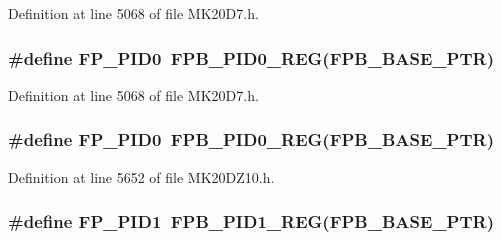 Definition at line 5068 of file M\+K20\+D7.\+h.

\subsubsection[{\texorpdfstring{F\+P\+\_\+\+P\+I\+D0}{FP_PID0}}]{\setlength{\rightskip}{0pt plus 5cm}\#define F\+P\+\_\+\+P\+I\+D0~{\bf F\+P\+B\+\_\+\+P\+I\+D0\+\_\+\+R\+EG}({\bf F\+P\+B\+\_\+\+B\+A\+S\+E\+\_\+\+P\+TR})}\hypertarget{group___f_p_b___register___accessor___macros_ga8e0747f228e5fad0edcf470d86723339}{}\label{group___f_p_b___register___accessor___macros_ga8e0747f228e5fad0edcf470d86723339}


Definition at line 5068 of file M\+K20\+D7.\+h.

\subsubsection[{\texorpdfstring{F\+P\+\_\+\+P\+I\+D0}{FP_PID0}}]{\setlength{\rightskip}{0pt plus 5cm}\#define F\+P\+\_\+\+P\+I\+D0~{\bf F\+P\+B\+\_\+\+P\+I\+D0\+\_\+\+R\+EG}({\bf F\+P\+B\+\_\+\+B\+A\+S\+E\+\_\+\+P\+TR})}\hypertarget{group___f_p_b___register___accessor___macros_ga8e0747f228e5fad0edcf470d86723339}{}\label{group___f_p_b___register___accessor___macros_ga8e0747f228e5fad0edcf470d86723339}


Definition at line 5652 of file M\+K20\+D\+Z10.\+h.

\subsubsection[{\texorpdfstring{F\+P\+\_\+\+P\+I\+D1}{FP_PID1}}]{\setlength{\rightskip}{0pt plus 5cm}\#define F\+P\+\_\+\+P\+I\+D1~{\bf F\+P\+B\+\_\+\+P\+I\+D1\+\_\+\+R\+EG}({\bf F\+P\+B\+\_\+\+B\+A\+S\+E\+\_\+\+P\+TR})}\hypertarget{group___f_p_b___register___accessor___macros_ga53c955868f162231b4bdf5be5cfbc084}{}\label{group___f_p_b___register___accessor___macros_ga53c955868f162231b4bdf5be5cfbc084}


